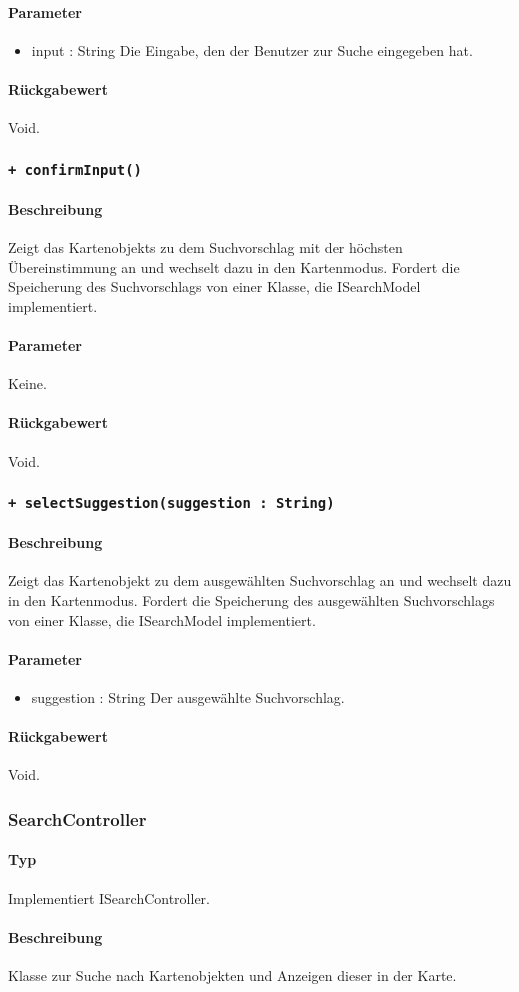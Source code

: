 \paragraph*{Parameter}
\begin{itemize}
    \item input : String Die Eingabe, den der Benutzer zur Suche eingegeben hat.
\end{itemize}
\paragraph*{Rückgabewert}
Void.

\subsubsection*{\texttt{+ confirmInput()}}%
\paragraph*{Beschreibung}
Zeigt das Kartenobjekts zu dem Suchvorschlag mit der höchsten Übereinstimmung an und wechselt dazu in den Kartenmodus.
Fordert die Speicherung des Suchvorschlags von einer Klasse, die ISearchModel implementiert.
\paragraph*{Parameter}
Keine.
\paragraph*{Rückgabewert}
Void.

\subsubsection*{\texttt{+ selectSuggestion(suggestion : String)}}%
\paragraph*{Beschreibung}
Zeigt das Kartenobjekt zu dem ausgewählten Suchvorschlag an und wechselt dazu in den Kartenmodus.
Fordert die Speicherung des ausgewählten Suchvorschlags von einer Klasse, die ISearchModel implementiert.
\paragraph*{Parameter}
\begin{itemize}
    \item suggestion : String Der ausgewählte Suchvorschlag.
\end{itemize}
\paragraph*{Rückgabewert}
Void.


\subsubsection{SearchController}
\paragraph*{Typ}
Implementiert ISearchController.
\paragraph*{Beschreibung}
Klasse zur Suche nach Kartenobjekten und Anzeigen dieser in der Karte.